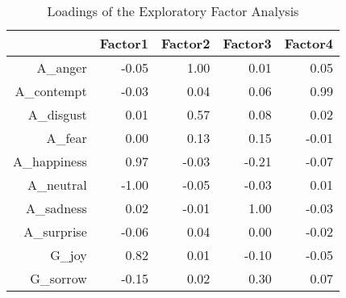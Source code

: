 \begin{table}[ht]
\centering
\begin{tabular}{rrrrr}
  \hline
 & Factor1 & Factor2 & Factor3 & Factor4 \\ 
  \hline
A\_anger & -0.05 & 1.00 & 0.01 & 0.05 \\ 
  A\_contempt & -0.03 & 0.04 & 0.06 & 0.99 \\ 
  A\_disgust & 0.01 & 0.57 & 0.08 & 0.02 \\ 
  A\_fear & 0.00 & 0.13 & 0.15 & -0.01 \\ 
  A\_happiness & 0.97 & -0.03 & -0.21 & -0.07 \\ 
  A\_neutral & -1.00 & -0.05 & -0.03 & 0.01 \\ 
  A\_sadness & 0.02 & -0.01 & 1.00 & -0.03 \\ 
  A\_surprise & -0.06 & 0.04 & 0.00 & -0.02 \\ 
  G\_joy & 0.82 & 0.01 & -0.10 & -0.05 \\ 
  G\_sorrow & -0.15 & 0.02 & 0.30 & 0.07 \\ 
   \hline
\end{tabular}
\caption{Loadings of the Exploratory Factor Analysis} 
\label{Tab:Load}
\end{table}
